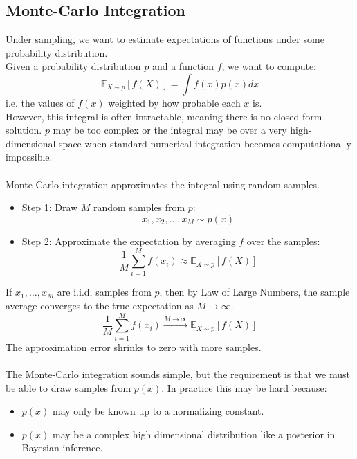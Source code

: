 \documentclass[../Probability.tex]{subfiles}
\begin{document}
\subsection{Monte-Carlo Integration}
Under sampling, we want to estimate expectations of functions under some probability distribution.\\
Given a probability distribution $p$ and a function $f$, we want to compute:
$$\mathbb{E}_{X \sim p}[f(X)] = \int f(x)p(x)dx$$
i.e. the values of $f(x)$ weighted by how probable each $x$ is.\\
However, this integral is often intractable, meaning there is no closed form solution.
$p$ may be too complex or the integral may be over a very high-dimensional space when standard numerical integration becomes computationally impossible.\\
\\
Monte-Carlo integration approximates the integral using random samples.
\begin{itemize}
    \item Step 1: Draw $M$ random samples from $p$:
    $$x_1, x_2, \dots, x_M \sim p(x)$$
    \item Step 2: Approximate the expectation by averaging $f$ over the samples:
    $$\frac{1}{M}\sum_{i=1}^{M} f(x_i) \approx \mathbb{E}_{X \sim p}[f(X)]$$
\end{itemize}
If $x_1,\ldots,x_M$ are i.i.d, samples from $p$, then by Law of Large Numbers, the sample average converges to the true expectation as $M\to\infty$.
$$\frac{1}{M}\sum_{i=1}^{M} f(x_i) \xrightarrow{M \to \infty} \mathbb{E}_{X \sim p}[f(X)]$$
The approximation error shrinks to zero with more samples.\\
\\
The Monte-Carlo integration sounds simple, but the requirement is that we must be able to draw samples from $p(x)$. In practice this may be hard because:
\begin{itemize}
    \item $p(x)$ may only be known up to a normalizing constant.
    \item $p(x)$ may be a complex high dimensional distribution like a posterior in Bayesian inference.
\end{itemize}
\end{document}
